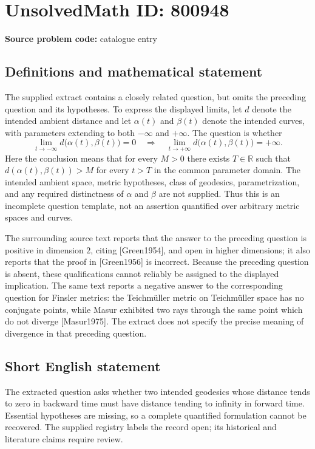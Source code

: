 \documentclass[11pt]{article}
\newcommand{\R}{\mathbb{R}}
\begin{document}
\section*{UnsolvedMath ID: 800948}
\textbf{Source problem code:} catalogue entry
\subsection{Definitions and mathematical statement}
The supplied extract contains a closely related question, but omits the preceding question and its hypotheses. To express the displayed limits, let \(d\) denote the intended ambient distance and let \(\alpha(t)\) and \(\beta(t)\) denote the intended curves, with parameters extending to both \(-\infty\) and \(+\infty\). The question is whether
\[
\lim_{t\to-\infty}d\bigl(\alpha(t),\beta(t)\bigr)=0
\quad\Longrightarrow\quad
\lim_{t\to+\infty}d\bigl(\alpha(t),\beta(t)\bigr)=+\infty.
\]
Here the conclusion means that for every \(M>0\) there exists \(T\in\R\) such that \(d(\alpha(t),\beta(t))>M\) for every \(t>T\) in the common parameter domain. The intended ambient space, metric hypotheses, class of geodesics, parametrization, and any required distinctness of \(\alpha\) and \(\beta\) are not supplied. Thus this is an incomplete question template, not an assertion quantified over arbitrary metric spaces and curves.

The surrounding source text reports that the answer to the preceding question is positive in dimension \(2\), citing [Green1954], and open in higher dimensions; it also reports that the proof in [Green1956] is incorrect. Because the preceding question is absent, these qualifications cannot reliably be assigned to the displayed implication. The same text reports a negative answer to the corresponding question for Finsler metrics: the Teichm\"uller metric on Teichm\"uller space has no conjugate points, while Masur exhibited two rays through the same point which do not diverge [Masur1975]. The extract does not specify the precise meaning of divergence in that preceding question.
\subsection{Short English statement}
The extracted question asks whether two intended geodesics whose distance tends to zero in backward time must have distance tending to infinity in forward time. Essential hypotheses are missing, so a complete quantified formulation cannot be recovered. The supplied registry labels the record open; its historical and literature claims require review.
\end{document}
